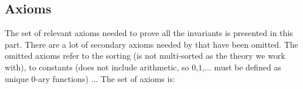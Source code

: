 \subsection{Axioms}

The set of relevant axioms needed to prove all the invariants is presented in this part.
%
There are a lot of secondary axioms needed by \spass that have been omitted. 
%
The omitted axioms refer to the sorting (\spass is not multi-sorted as the theory we work with), to constants (\spass does not include arithmetic, so $0$,$1$,... must be defined as unique 0-ary functions) ...
%
The set of axioms is:
		
\begin{description}
\label{ax::fulllist}

\end{description}

